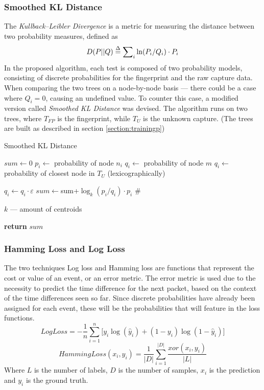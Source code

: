 \documentclass[13pt,journal,compsoc,onecolumn]{IEEEtran}
\makeatletter
\def\NoNumber#1{{\def\alglinenumber##1{}\State #1}\addtocounter{ALG@line}{-1}}
\newcommand\LONGCOMMENT[1]{%
  \hfill\#\ \begin{minipage}[t]{\eqboxwidth{COMMENT}}#1\strut\end{minipage}%
}
\makeatother
\begin{document}
\subsubsection{Smoothed KL Distance}
The \emph{Kullback--Leibler Divergence} is a metric for measuring the distance between two probability measures, defined as 
\begin{equation}\label{eq:kld}
D(P||Q) \buildrel \Delta \over = \sum\nolimits_i {\ln ({P_i}/{Q_i}) \cdot {P_i}}
\end{equation}
In the proposed algorithm, each test is composed of two probability models, consisting of discrete probabilities for the fingerprint and the raw capture data. When comparing the two trees on a node-by-node basis --- there could be a case where $Q_i=0$, causing an undefined value.
To counter this case, a modified version called \emph{Smoothed KL Distance} was devised.
The algorithm runs on two trees, where $T_{FP}$ is the fingerprint, while $T_U$ is the unknown capture.
(The trees are built as described in section \ref{section:trainingp})
\begin{algorithm}
\caption{Smoothed KL Distance}\label{kld}
\begin{algorithmic}[1]
\State $sum\gets0$
      \State $p_i\gets$ probability of node $n_i$
      	\State $q_i\gets$ probability of node $m$
      \Else
      	\State $q_i\gets$ probability of closest node in $T_U$ \NoNumber{(lexicographically)}
      	\State $q_i\gets q_i\cdot\varepsilon$
      \EndIf
   \State$sum\gets 
   $sum+$ \log_k (p_i/q_i) \cdot {p_i}$\LONGCOMMENT{$k$ --- amount of centroids}
   \EndFor\label{euclidendwhile}
   \State \textbf{return} $sum$
\EndProcedure
\end{algorithmic}
\end{algorithm}
\subsubsection{Hamming Loss and Log Loss}
The two techniques Log loss \cite{Bis06} and Hamming loss \cite{Tso07, Ham50} are functions that represent the cost or value of an event, or an error metric.
The error metric is used due to the necessity to predict the time difference for the next packet, based on the context of the time differences seen so far.
Since discrete probabilities have already been assigned for each event, these will be the probabilities that will feature in the loss functions.
\begin{equation}\label{eq:ll}
LogLoss =  - \frac{1}{n}\sum\limits_{i = 1}^n {[{y_i}\log ({{\hat y}_i}) + (1 - {y_i})\log } (1 - {\hat y_i})]
\end{equation}
\begin{equation}\label{eq:hl}
HammingLoss({x_i},{y_i}) = \frac{1}{{\left| D \right|}}\sum\limits_{i = 1}^{\left| D \right|} {\frac{{xor({x_i},{y_i})}}{{\left| L \right|}}}
\end{equation}
Where $L$ is the number of labels, $D$ is the number of samples, $x_i$ is the prediction and $y_i$ is the ground truth.
\end{document}
